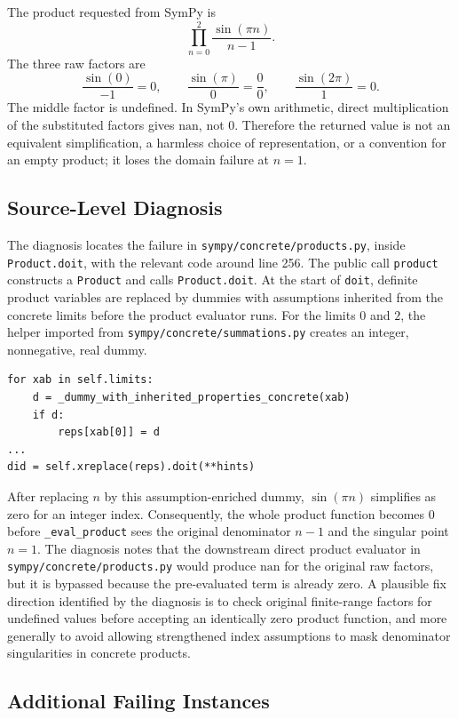 \documentclass[11pt]{article}
\begin{document}
The product requested from SymPy is
\[
  \prod_{n=0}^{2} \frac{\sin(\pi n)}{n-1}.
\]
The three raw factors are
\[
  \frac{\sin(0)}{-1}=0,\qquad
  \frac{\sin(\pi)}{0}=\frac{0}{0},\qquad
  \frac{\sin(2\pi)}{1}=0.
\]
The middle factor is undefined. In SymPy's own arithmetic, direct multiplication
of the substituted factors gives \(\mathrm{nan}\), not \(0\). Therefore the
returned value is not an equivalent simplification, a harmless choice of
representation, or a convention for an empty product; it loses the domain
failure at \(n=1\).

\subsection{Source-Level Diagnosis}

The diagnosis locates the failure in \nolinkurl{sympy/concrete/products.py},
inside \texttt{Product.doit}, with the relevant code around line 256. The public
call \texttt{product} constructs a \texttt{Product} and calls
\texttt{Product.doit}. At the start of \texttt{doit}, definite product variables
are replaced by dummies with assumptions inherited from the concrete limits
before the product evaluator runs. For the limits \(0\) and \(2\), the helper
imported from \nolinkurl{sympy/concrete/summations.py} creates an
integer, nonnegative, real dummy.

\begin{lstlisting}[style=bugpython]
for xab in self.limits:
    d = _dummy_with_inherited_properties_concrete(xab)
    if d:
        reps[xab[0]] = d
...
did = self.xreplace(reps).doit(**hints)
\end{lstlisting}

After replacing \(n\) by this assumption-enriched dummy, \(\sin(\pi n)\)
simplifies as zero for an integer index. Consequently, the whole product
function becomes \(0\) before \texttt{\_eval\_product} sees the original
denominator \(n-1\) and the singular point \(n=1\). The diagnosis notes that the
downstream direct product evaluator in \nolinkurl{sympy/concrete/products.py}
would produce \(\mathrm{nan}\) for the original raw factors, but it is bypassed
because the pre-evaluated term is already zero. A plausible fix direction
identified by the diagnosis is to check original finite-range factors for
undefined values before accepting an identically zero product function, and more
generally to avoid allowing strengthened index assumptions to mask denominator
singularities in concrete products.

\subsection{Additional Failing Instances}
\end{document}
